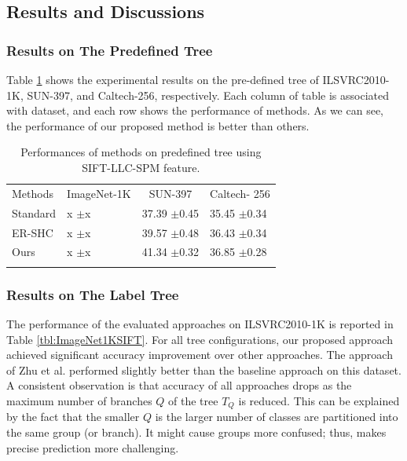 \documentclass[review]{elsarticle}
\begin{document}
\subsection{Results and Discussions}

\subsubsection{Results on The Predefined Tree}
Table \ref{tbl:PreTree} shows the experimental results on the pre-defined tree of ILSVRC2010-1K, SUN-397, and Caltech-256, respectively.
Each column of table is associated with dataset, and each row shows the performance of methods. As we can see, the performance of our proposed method is better than others.

\begin{table}
\caption{Performances of methods on predefined tree using SIFT-LLC-SPM feature.}  
\label{tbl:PreTree} 
\centering
\begin{tabular}{llll}
\hline\noalign{\smallskip}
Methods  & \multicolumn{1}{c}{ImageNet-1K} & \multicolumn{1}{c}{SUN-397} & \multicolumn{1}{c}{Caltech- 256} \\
\noalign{\smallskip}\hline\hline\noalign{\smallskip}
Standard 	 				& x $\pm$x & 37.39 $\pm$0.45 & 35.45 $\pm$0.34 \\
ER-SHC \cite{Zhu.CVIU2014} 	& x $\pm$x & 39.57 $\pm$0.48 & 36.43 $\pm$0.34 \\
Ours     				    & x $\pm$x & 41.34 $\pm$0.32 & 36.85 $\pm$0.28 \\
\noalign{\smallskip}\hline\noalign{\smallskip}
\end{tabular}
\end{table}

\subsubsection{Results on The Label Tree}

The performance of the evaluated approaches on ILSVRC2010-1K is reported in Table \ref{tbl:ImageNet1KSIFT}. For all tree configurations, our proposed approach achieved significant accuracy improvement over other approaches. The approach of Zhu et al. performed slightly better than the baseline approach on this dataset. A consistent observation is that accuracy of all approaches drops as the maximum number of branches $Q$ of the tree $T_Q$ is reduced. This can be explained by the fact that the smaller $Q$ is the larger number of classes are partitioned into the same group (or branch). It might cause groups more confused; thus, makes precise prediction more challenging.
\end{document}
